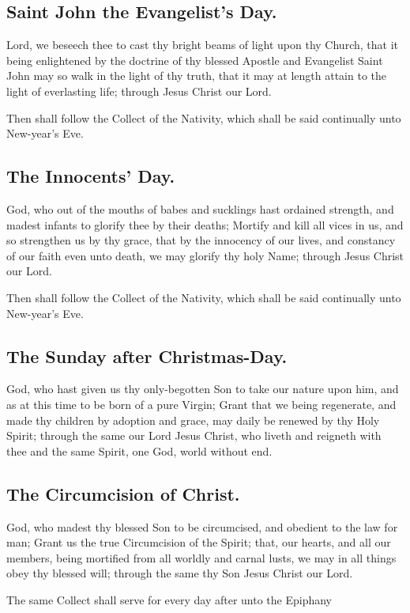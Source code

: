 \subsection{Saint John the Evangelist's Day.}
 Lord, we beseech thee to cast thy bright beams of light upon thy Church, that it being enlightened by the doctrine of thy blessed Apostle and Evangelist Saint John may so walk in the light of thy truth, that it may at length attain to the light of everlasting life; through Jesus Christ our Lord.
\begin{secrubric}
Then shall follow the Collect of the Nativity, which shall be said continually unto New-year's Eve.
\end{secrubric}

\subsection{The Innocents' Day.}
 God, who out of the mouths of babes and sucklings hast ordained strength, and madest infants to glorify thee by their deaths; Mortify and kill all vices in us, and so strengthen us by thy grace, that by the innocency of our lives, and constancy of our faith even unto death, we may glorify thy holy Name; through Jesus Christ our Lord.
\begin{secrubric}
Then shall follow the Collect of the Nativity, which shall be said continually unto New-year's Eve.
\end{secrubric}

\subsection{The Sunday after Christmas-Day.}
 God, who hast given us thy only-begotten Son to take our nature upon him, and as at this time to be born of a pure Virgin; Grant that we being regenerate, and made thy children by adoption and grace, may daily be renewed by thy Holy Spirit; through the same our Lord Jesus Christ, who liveth and reigneth with thee and the same Spirit, one God, world without end.

\subsection{The Circumcision of Christ.}
 God, who madest thy blessed Son to be circumcised, and obedient to the law for man; Grant us the true Circumcision of the Spirit; that, our hearts, and all our members, being mortified from all worldly and carnal lusts, we may in all things obey thy blessed will; through the same thy Son Jesus Christ our Lord.
\begin{secrubric}
The same Collect shall serve for every day after unto the Epiphany
\end{secrubric}

